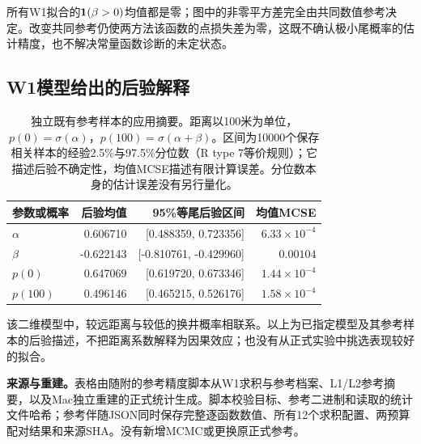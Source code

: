 所有W1拟合的$\mathbf{1}(\beta>0)$均值都是零；图中的非零平方差完全由共同数值参考决定。改变共同参考仍使两方法该函数的点损失差为零，这既不确认极小尾概率的估计精度，也不解决常量函数诊断的未定状态。

\subsection{W1模型给出的后验解释}
\begin{table}[htbp]\centering\small
\begin{tabular}{lrrr}\toprule
参数或概率 & 后验均值 & 95\%等尾后验区间 & 均值MCSE\\\midrule
$\alpha$ & 0.606710 & [0.488359, 0.723356] & $6.33\times10^{-4}$\\
$\beta$ & -0.622143 & [-0.810761, -0.429960] & $0.00104$\\
$p(0)$ & 0.647069 & [0.619720, 0.673346] & $1.44\times10^{-4}$\\
$p(100)$ & 0.496146 & [0.465215, 0.526176] & $1.58\times10^{-4}$\\
\bottomrule\end{tabular}
\caption{独立既有参考样本的应用摘要。距离以100米为单位，$p(0)=\sigma(\alpha)$，$p(100)=\sigma(\alpha+\beta)$。区间为10000个保存相关样本的经验2.5\%与97.5\%分位数（R type 7等价规则）；它描述后验不确定性，均值MCSE描述有限计算误差。分位数本身的估计误差没有另行量化。}
\label{tab:wells-posterior-application}
\end{table}
该二维模型中，较远距离与较低的换井概率相联系。以上为已指定模型及其参考样本的后验描述，不把距离系数解释为因果效应；也没有从正式实验中挑选表现较好的拟合。

\noindent\textbf{来源与重建。}表格由随附的参考精度脚本从W1求积与参考档案、L1/L2参考摘要，以及Mac独立重建的正式统计生成。脚本校验目标、参考二进制和读取的统计文件哈希；参考伴随JSON同时保存完整逐函数数值、所有12个求积配置、两预算配对结果和来源SHA。没有新增MCMC或更换原正式参考。

